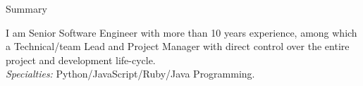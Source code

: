 \documentclass[]{mcdowellcv}
\begin{document}
    \makeheader
    \label{Contact}

    \begin{cvsection}{Summary}
        \label{Summary}
        \begin{cvsubsection}{}{}{}
            I am Senior Software Engineer with more than 10 years experience, among which a Technical/team Lead and Project Manager with direct control over the entire project and development life-cycle.\\
            \textit{Specialties:} Python/JavaScript/Ruby/Java Programming.
        \end{cvsubsection}
    \end{cvsection}

\end{document}
